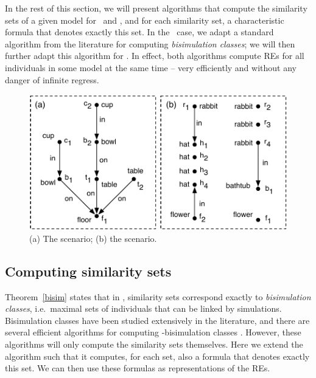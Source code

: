 In the rest of this section, we will present algorithms that compute
the similarity sets of a given model for \alc\ and \el, and for each
similarity set, a characteristic formula that denotes exactly this
set.  In the \alc\ case, we adapt a standard algorithm from the
literature for computing \emph{bisimulation classes}; we will then
further adapt this algorithm for \el.  In effect, both algorithms
compute REs for all individuals in some model at the same time -- very
efficiently and without any danger of infinite regress.


\begin{figure}[t]
  \centering
  \includegraphics[width=\columnwidth]{pic-dale-haddock}
  \caption{(a) The 
    scenario; (b) the  scenario.}
  \label{fig:dale-haddock}
\end{figure}


\subsection{Computing similarity sets}

Theorem~\ref{bisim} states that in \alc, similarity sets correspond
exactly to \emph{bisimulation classes}, i.e.\ maximal sets of
individuals that can be linked by simulations.  Bisimulation classes
have been studied extensively in the literature, and there are several
efficient algorithms for computing \alc-bisimulation classes
\cite{hopc:algo71,paig:thre87,dovier04:_effic_algor_for_comput_bisim_equiv}.
However, these algorithms will only compute the similarity sets
themselves. Here we extend the  algorithm such
that it computes, for each set, also a formula that denotes exactly
this set.  We can then use these formulas as representations of the
REs.

